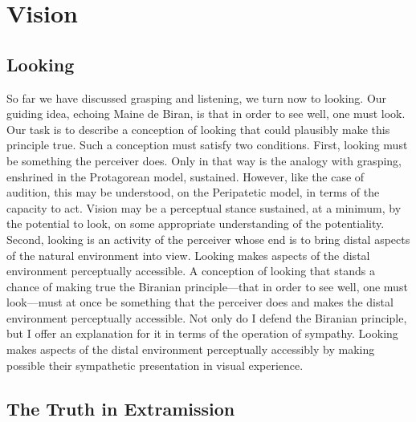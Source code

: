 \chapter{Vision} %
\label{cha:vision}

\section{Looking} %
\label{sec:looking}

So far we have discussed grasping and listening, we turn now to looking. Our guiding idea, echoing Maine de Biran, is that in order to see well, one must look. Our task is to describe a conception of looking that could plausibly make this principle true. Such a conception must satisfy two conditions. First, looking must be something the perceiver does. Only in that way is the analogy with grasping, enshrined in the Protagorean model, sustained. However, like the case of audition, this may be understood, on the Peripatetic model, in terms of the capacity to act. Vision may be a perceptual stance sustained, at a minimum, by the potential to look, on some appropriate understanding of the potentiality. Second, looking is an activity of the perceiver whose end is to bring distal aspects of the natural environment into view. Looking makes aspects of the distal environment perceptually accessible. A conception of looking that stands a chance of making true the Biranian principle---that in order to see well, one must look---must at once be something that the perceiver does and makes the distal environment perceptually accessible. Not only do I defend the Biranian principle, but I offer an explanation for it in terms of the operation of sympathy. Looking makes aspects of the distal environment perceptually accessibly by making possible their sympathetic presentation in visual experience.





\section{The Truth in Extramission} %
\label{sec:the_truth_in_extramission}

